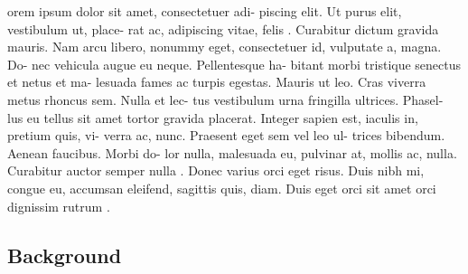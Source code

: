 \noindent
orem ipsum dolor sit amet, consectetuer adi-
piscing elit. Ut purus elit, vestibulum ut, place-
rat ac, adipiscing vitae, felis \cite{Dahal2024}. Curabitur dictum
gravida mauris. Nam arcu libero, nonummy
eget, consectetuer id, vulputate a, magna. Do-
nec vehicula augue eu neque. Pellentesque ha-
bitant morbi tristique senectus et netus et ma-
lesuada fames ac turpis egestas. Mauris ut leo.
Cras viverra metus rhoncus sem. Nulla et lec-
tus vestibulum urna fringilla ultrices. Phasel-
lus eu tellus sit amet tortor gravida placerat.
Integer sapien est, iaculis in, pretium quis, vi-
verra ac, nunc. Praesent eget sem vel leo ul-
trices bibendum. Aenean faucibus. Morbi do-
lor nulla, malesuada eu, pulvinar at, mollis ac,
nulla. Curabitur auctor semper nulla \cite{Dahal2024}. Donec
varius orci eget risus. Duis nibh mi, congue eu,
accumsan eleifend, sagittis quis, diam. Duis
eget orci sit amet orci dignissim rutrum \cite{Hao2024}.
\lipsum[1-1]

\subsection{Background}
\lipsum[1-1]